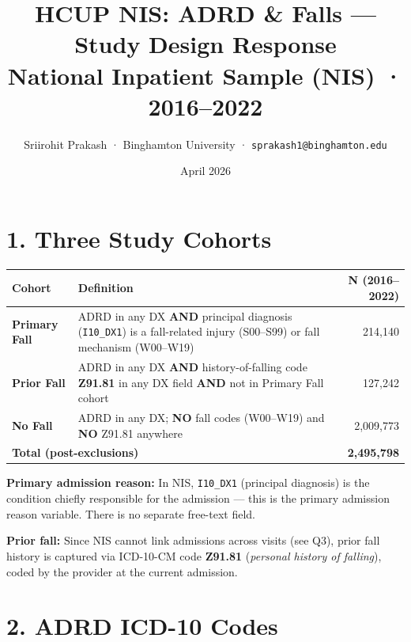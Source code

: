 \documentclass[11pt,letterpaper]{article}
\title{
  \vspace{-1cm}
  \textbf{\textcolor{hcupblue}{\large HCUP NIS: ADRD \& Falls — Study Design Response}}\\[4pt]
  \normalsize National Inpatient Sample (NIS) · 2016--2022
}
\author{Sriirohit Prakash · Binghamton University · \texttt{sprakash1@binghamton.edu}}
\date{April 2026}
\begin{document}
\maketitle
\thispagestyle{fancy}

\section*{1. Three Study Cohorts}

\begin{center}
\renewcommand{\arraystretch}{1.4}
\begin{tabularx}{\textwidth}{lXr}
\toprule
\textbf{Cohort} & \textbf{Definition} & \textbf{N (2016--2022)} \\
\midrule
\textbf{Primary Fall}
  & ADRD in any DX \textbf{AND} principal diagnosis (\texttt{I10\_DX1}) is a
    fall-related injury (S00--S99) or fall mechanism (W00--W19)
  & 214,140 \\[4pt]
\textbf{Prior Fall}
  & ADRD in any DX \textbf{AND} history-of-falling code \textbf{Z91.81}
    in any DX field \textbf{AND} not in Primary Fall cohort
  & 127,242 \\[4pt]
\textbf{No Fall}
  & ADRD in any DX; \textbf{NO} fall codes (W00--W19) and \textbf{NO} Z91.81
    anywhere
  & 2,009,773 \\
\midrule
\multicolumn{2}{l}{\textbf{Total (post-exclusions)}} & \textbf{2,495,798} \\
\bottomrule
\end{tabularx}
\end{center}

\medskip
\noindent\textbf{Primary admission reason:} In NIS, \texttt{I10\_DX1} (principal diagnosis)
is the condition chiefly responsible for the admission — this is the primary admission reason
variable. There is no separate free-text field.

\medskip
\noindent\textbf{Prior fall:} Since NIS cannot link admissions across visits (see Q3),
prior fall history is captured via ICD-10-CM code \textbf{Z91.81}
(\textit{personal history of falling}), coded by the provider at the current admission.

\section*{2. ADRD ICD-10 Codes}
\end{document}

